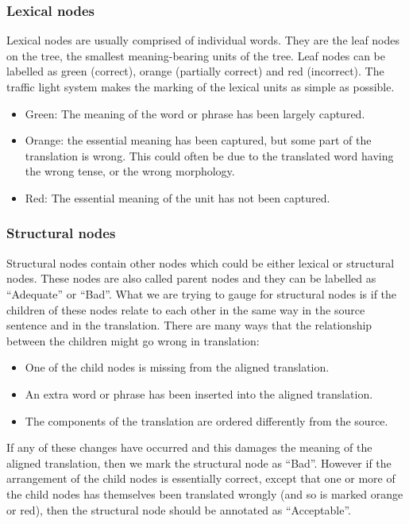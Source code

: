 \documentclass[11pt]{article}
\begin{document}
\subsubsection{Lexical nodes}
Lexical nodes are usually comprised of individual words. They are the leaf nodes on the tree, the smallest 
meaning-bearing
units of the tree.
Leaf nodes can be labelled as green (correct), orange (partially correct) and red (incorrect). 
The traffic light system makes the marking of the
lexical units as simple as possible.

\begin{itemize}
\item Green: The meaning of the word or phrase has been largely captured.
\item Orange: the essential meaning has been captured, but some part of the translation is wrong. This could often be due to the translated word having the wrong tense, or the wrong morphology. 
\item Red: The essential meaning of the unit has not been captured.
\end{itemize}


\subsubsection{Structural nodes}

Structural nodes contain other nodes which could be either lexical or structural nodes. 
These nodes are also called parent nodes and they can be labelled as ``Adequate'' or ``Bad''. 
What we are trying to gauge for structural nodes
is if the children of these nodes
relate to each other in the same way in the source sentence and in the translation. 
There are many ways that the relationship between the children might go wrong in translation:
\begin{itemize}
\item One of the child nodes is missing from the aligned translation. 
\item An extra word or phrase has been inserted into the aligned  translation.
\item The components of the translation are ordered differently 
from
the source.
\end{itemize}

If any of these changes have occurred and this damages the meaning of the aligned translation, then we mark the 
structural node as ``Bad''. 
However if the arrangement of the child nodes is essentially correct, except that one or
more of the child nodes has themselves been translated wrongly (and so is marked
orange or red), then the structural node should be 
annotated as ``Acceptable''.
\end{document}
